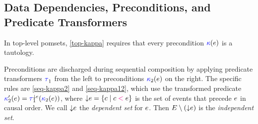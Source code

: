 \subsection{Data Dependencies, Preconditions, and Predicate Transformers}
\label{sec:ex:data}


In top-level pomsets, \ref{top-kappa} requires that every precondition
${\color{blue}\kappa}(e)$ is a tautology.

Preconditions are discharged during sequential composition by applying
predicate transformers $\aTr[1]{}{}$ from the left to preconditions
${\color{blue}\kappa}_2(e)$ on the right.  The specific rules are
\ref{seq-kappa2} and \ref{seq-kappa12}, which use the transformed predicate
$\labelingForm'_2(\aEv)=\aTr[1]{\Cdown{\aEv}}{\labelingForm_2(\aEv})$, where
$\smash{\downarrow}e=\{ c \mid c \mathrel{{\color{magenta}<}} e \}$ is the set of events that
precede $e$ in causal order.  We call $\smash{\downarrow}e$ the \emph{dependent
  set} for $e$.  Then $E\setminus(\smash{\downarrow}e)$ is the
\emph{independent set}. %



